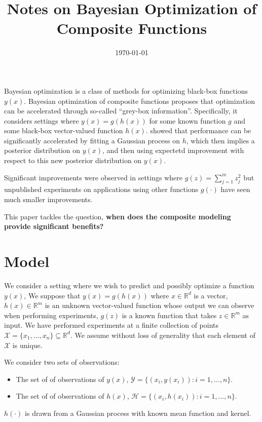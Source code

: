 \documentclass[11pt]{article}
\title{Notes on Bayesian Optimization of Composite Functions}
\date{\today}
\newcommand{\X}{\mathcal{X}}
\newcommand{\Y}{\mathcal{Y}}
\renewcommand{\H}{\mathcal{H}}
\begin{document}
\maketitle

Bayesian optimization is a class of methods for optimizing black-box functions $y(x)$.
Bayesian optimization of composite functions proposes that optimization can be accelerated through so-called ``grey-box information''.  Specifically, it considers settings where $y(x) = g(h(x))$ for some known function $g$ and some black-box vector-valued function $h(x)$.  \citet{pmlr-v97-astudillo19a} showed that performance can be significantly accelerated by fitting a Gaussian process on $h$, which then implies a posterior distribution on $y(x)$, and then using expectetd improvement with respect to this new posterior distribution on $y(x)$.

Significant improvements were observed in settings where $g(z) = \sum_{j=1}^m z_j^2$ but unpublished experiments on applications using other functions $g(\cdot)$ have seen much smaller improvements.

This paper tackles the question, {\bf when does the composite modeling provide significant benefits?}

\section{Model}

We consider a setting where we wish to predict and possibly optimize a function $y(x)$,
We suppose that $y(x) = g(h(x))$ where $x \in \mathbb{R}^d$ is a vector, $h(x) \in \mathbb{R}^m$ is an unknown vector-valued function whose output we can observe when performing experiments, $g(z)$ is a known function that takes $z \in \mathbb{R}^m$ as input.  We have performed experiments at a finite collection of points $\X = \{x_1, \ldots, x_n\} \subseteq \mathbb{R}^d$. We assume without loss of generality that each element of $\X$ is unique.

We consider two sets of observations:
\begin{itemize}
\item The set of of observations of $y(x)$, $\Y = \{ (x_i, y(x_i)) : i=1,\ldots,n \}$.
\item The set of of observations of $h(x)$, $\H = \{ (x_i, h(x_i)) : i=1,\ldots,n \}$.
\end{itemize}

$h(\cdot)$ is drawn from a Gaussian process with known mean function and kernel.
\end{document}
